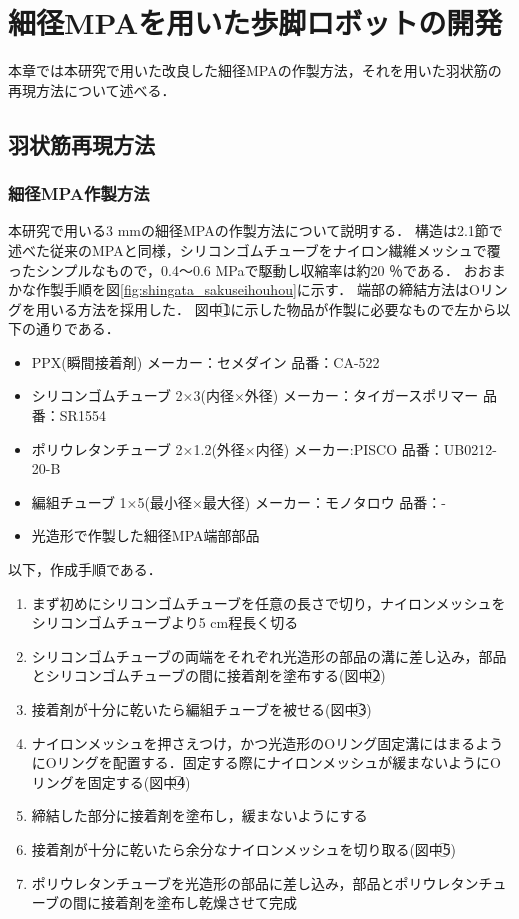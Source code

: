 \newpage
\section{細径MPAを用いた歩脚ロボットの開発}
本章では本研究で用いた改良した細径MPAの作製方法，それを用いた羽状筋の再現方法について述べる．
\subsection{羽状筋再現方法}
\subsubsection{細径MPA作製方法}
本研究で用いる3 mmの細径MPAの作製方法について説明する．
構造は2.1節で述べた従来のMPAと同様，シリコンゴムチューブをナイロン繊維メッシュで覆ったシンプルなもので，0.4～0.6 MPaで駆動し収縮率は約20 ％である．
おおまかな作製手順を図\ref{fig:shingata_sakuseihouhou}に示す．
端部の締結方法はOリングを用いる方法を採用した．
図中\textcircled{\scriptsize 1}に示した物品が作製に必要なもので左から以下の通りである．
%
\begin{itemize}
  \item PPX(瞬間接着剤) メーカー：セメダイン 品番：CA-522
  \item シリコンゴムチューブ 2×3(内径×外径) メーカー：タイガースポリマー 品番：SR1554
  \item ポリウレタンチューブ 2×1.2(外径×内径) メーカー:PISCO 品番：UB0212-20-B
  \item 編組チューブ 1×5(最小径×最大径) メーカー：モノタロウ 品番：-
  \item 光造形で作製した細径MPA端部部品
\end{itemize}
%
以下，作成手順である．
%
\begin{enumerate}
  \item まず初めにシリコンゴムチューブを任意の長さで切り，ナイロンメッシュをシリコンゴムチューブより5 cm程長く切る
  \item シリコンゴムチューブの両端をそれぞれ光造形の部品の溝に差し込み，部品とシリコンゴムチューブの間に接着剤を塗布する(図中\textcircled{\scriptsize 2})
  \item 接着剤が十分に乾いたら編組チューブを被せる(図中\textcircled{\scriptsize 3})
  \item ナイロンメッシュを押さえつけ，かつ光造形のOリング固定溝にはまるようにOリングを配置する．固定する際にナイロンメッシュが緩まないようにOリングを固定する(図中\textcircled{\scriptsize 4})
  \item 締結した部分に接着剤を塗布し，緩まないようにする
  \item 接着剤が十分に乾いたら余分なナイロンメッシュを切り取る(図中\textcircled{\scriptsize 5})
  \item ポリウレタンチューブを光造形の部品に差し込み，部品とポリウレタンチューブの間に接着剤を塗布し乾燥させて完成
\end{enumerate}
